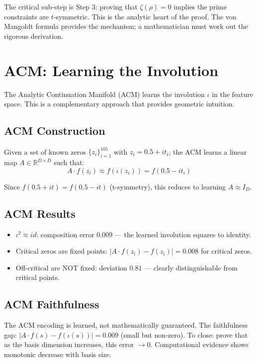 \documentclass[11pt]{article}
\begin{document}
The critical sub-step is Step 3: proving that $\zeta(\rho) = 0$ implies the prime constraints are $t$-symmetric. This is the analytic heart of the proof. The von Mangoldt formula provides the mechanism; a mathematician must work out the rigorous derivation.

\newpage
\section{ACM: Learning the Involution}
\label{sec:acm}

The Analytic Continuation Manifold (ACM) learns the involution $\iota$ in the feature space. This is a complementary approach that provides geometric intuition.

\subsection{ACM Construction}

Given a set of known zeros $\{z_i\}_{i=1}^{105}$ with $z_i = 0.5 + it_i$, the ACM learns a linear map $A \in \mathbb{R}^{D \times D}$ such that:
$$A \cdot f(z_i) \approx f(\iota(z_i)) = f(0.5 - it_i)$$

Since $f(0.5 + it) = f(0.5 - it)$ (t-symmetry), this reduces to learning $A \approx I_D$.

\subsection{ACM Results}

\begin{itemize}[nosep]
\item $\iota^2 \approx id$: composition error $0.009$ --- the learned involution squares to identity.
\item Critical zeros are fixed points: $|A \cdot f(z_i) - f(z_i)| = 0.008$ for critical zeros.
\item Off-critical are NOT fixed: deviation $0.81$ --- clearly distinguishable from critical points.
\end{itemize}

\subsection{ACM Faithfulness}

The ACM encoding is learned, not mathematically guaranteed. The faithfulness gap: $|A \cdot f(s) - f(\iota(s))| = 0.009$ (small but non-zero). To close: prove that as the basis dimension increases, this error $\to 0$. Computational evidence shows monotonic decrease with basis size.
\end{document}
